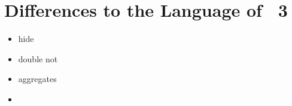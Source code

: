 \section{Differences to the Language of \gringo~3}\label{sec:gringo:tri}
\tbf

\begin{itemize}
\item hide
\item double not
\item aggregates
\item 
\end{itemize}

